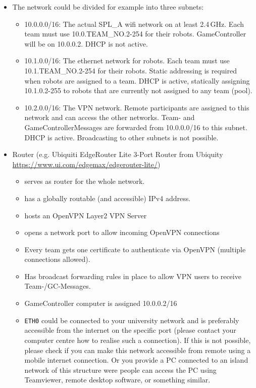 \begin{itemize}
    \item  The network could be divided for example into three subnets:
    \begin{itemize}
        \item 10.0.0.0/16: The actual SPL\_A wifi network on at least 2.4\,GHz. Each team must use 10.0.TEAM\_NO.2-254 for their robots. GameController will be on 10.0.0.2. DHCP is not active.
        \item 10.1.0.0/16: The ethernet network for robots. Each team must use 10.1.TEAM\_NO.2-254 for their robots. Static addressing is required when robots are assigned to a team. DHCP is active, statically assigning 10.1.0.2-255 to robots that are currently not assigned to any team (pool).
        \item 10.2.0.0/16: The VPN network. Remote participants are assigned to this network and can access the other networks. Team- and GameControllerMessages are forwarded from 10.0.0.0/16 to this subnet. DHCP is active. Broadcasting to other subnets is not possible.
    \end{itemize}
    \item Router (e.g. Ubiquiti EdgeRouter Lite 3-Port Router from Ubiquity \url{https://www.ui.com/edgemax/edgerouter-lite/})
    \begin{itemize}
        \item serves as router for the whole network.
        \item has a globally routable (and accessible) IPv4 address.
        \item hosts an OpenVPN Layer2 VPN Server
        \item opens a network port to allow incoming OpenVPN connections
        \item Every team gets one certificate to authenticate via OpenVPN (multiple connections allowed).
        \item Has broadcast forwarding rules in place to allow VPN users to receive Team-/GC-Messages.
        \item GameController computer is assigned 10.0.0.2/16
        \item \texttt{ETH0} could be connected to your university network and is preferably accessible from the internet on the specific port (please contact your computer centre how to realise such a connection). If this is not possible, please check if you can make this network accessible from remote using a mobile internet connection. Or you provide a PC connected to an island network of this structure were people can access the PC using Teamviewer, remote desktop software, or something similar. 
    \end{itemize}
\end{itemize}

